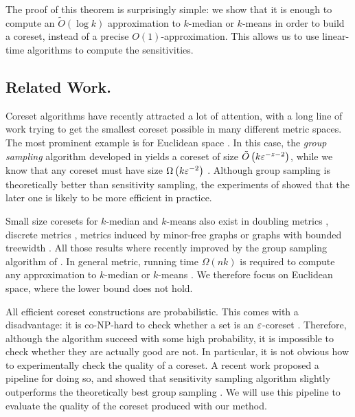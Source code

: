 The proof of this theorem is surprisingly simple: we show that it is enough to compute an $\tilde O(\log k)$ approximation to $k$-median or $k$-means in order
to build a coreset, instead of a precise $O(1)$-approximation. This allows us to use linear-time algorithms to compute the sensitivities.



\subsection{Related Work.}

Coreset algorithms have recently attracted a lot of attention, with a long line of work trying to get the smallest coreset possible in many different metric spaces. The most prominent example is for Euclidean space \cite{BadoiuHI02, HaM04, Chen09, HuangV20, stoc22}. 
In this case, the \textit{group sampling} algorithm developed in \cite{stoc21, stoc22} yields a coreset of size $\tilde O\left( k \varepsilon^{-z-2}\right)$, while we know that any coreset must have size $\Omega \left( k\varepsilon^{-2}\right)$ \cite{stoc22}.
Although group sampling is theoretically better than sensitivity sampling, the experiments of \cite{chrisESA} showed that the later one is likely to be more efficient in practice.

Small size coresets for $k$-median and $k$-means also exist in doubling metrics \cite{huang2018varepsilon}, discrete metrics \cite{FeldmanL11}, metrics induced by minor-free graphs \cite{BravermanJKW21} or graphs with bounded treewidth \cite{baker2020coresets}. 
All those results where recently improved by the group sampling algorithm of \cite{stoc21}. 
In general metric, running time $\Omega(nk)$ is required to compute any approximation to $k$-median or $k$-means \cite{mettu2004optimal}. 
We therefore focus on Euclidean space, where the lower bound does not hold.


All efficient coreset constructions are probabilistic. This comes with a disadvantage: it is co-NP-hard to check whether a set is an $\varepsilon$-coreset \cite{chrisESA}. Therefore, although the algorithm succeed with some high probability, it is impossible to check whether they are actually good are not. 
In particular, it is not obvious how to experimentally check the quality of a coreset.
A recent work proposed a pipeline for doing so, and showed that sensitivity sampling algorithm slightly outperforms the theoretically best group sampling \cite{chrisESA}. 
We will use this pipeline to evaluate the quality of the coreset produced with our method.

